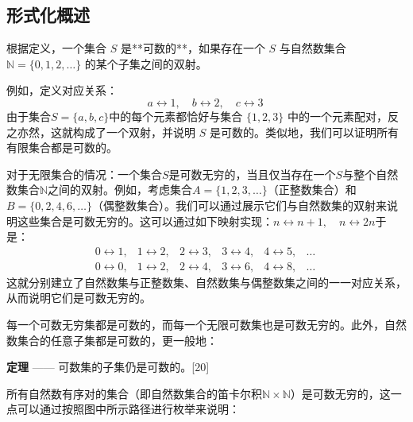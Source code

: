 \subsection{形式化概述}
根据定义，一个集合 $S$ 是**可数的**，如果存在一个 $S$ 与自然数集合 $\mathbb{N}=\{0,1,2,\dots\}$ 的某个子集之间的双射。

例如，定义对应关系：
$$
a \leftrightarrow 1, \quad b \leftrightarrow 2, \quad c \leftrightarrow 3~
$$
由于集合$S=\{a,b,c\}$中的每个元素都恰好与集合 $\{1,2,3\}$ 中的一个元素配对，反之亦然，这就构成了一个双射，并说明 $S$ 是可数的。类似地，我们可以证明所有有限集合都是可数的。

对于无限集合的情况：一个集合$S$是可数无穷的，当且仅当存在一个$S$与整个自然数集合$\mathbb{N}$之间的双射。例如，考虑集合$A = \{1,2,3,\dots\}$（正整数集合）和$B = \{0,2,4,6,\dots\}$（偶整数集合）。我们可以通过展示它们与自然数集的双射来说明这些集合是可数无穷的。这可以通过如下映射实现：$n\leftrightarrow n+1, \quad n \leftrightarrow 2n$于是：
$$
\begin{matrix}  
0 \leftrightarrow 1, & 1 \leftrightarrow 2, & 2 \leftrightarrow 3, & 3 \leftrightarrow 4, & 4 \leftrightarrow 5, & \dots \\[6pt]  
0 \leftrightarrow 0, & 1 \leftrightarrow 2, & 2 \leftrightarrow 4, & 3 \leftrightarrow 6, & 4 \leftrightarrow 8, & \dots  
\end{matrix} ~
$$
这就分别建立了自然数集与正整数集、自然数集与偶整数集之间的一一对应关系，从而说明它们是可数无穷的。

每一个可数无穷集都是可数的，而每一个无限可数集也是可数无穷的。此外，自然数集合的任意子集都是可数的，更一般地：

\textbf{定理} —— 可数集的子集仍是可数的。[20]

所有自然数有序对的集合（即自然数集合的笛卡尔积$\mathbb{N} \times \mathbb{N}$）是可数无穷的，这一点可以通过按照图中所示路径进行枚举来说明：
